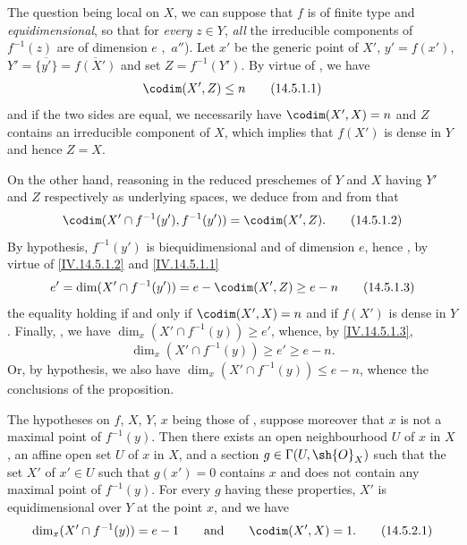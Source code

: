 The question being local on $X$, we can suppose that $f$ is of finite type and \emph{equidimensional}, so that for \emph{every} $z\in Y$, \emph{all} the irreducible components of $f^{-1}(z)$ are of dimension $e$ ,~$a''$).
Let $x'$ be the generic point of $X'$, $y'=f(x')$, $Y'=\overline{\{y'\}}=\overline{f(X')}$ and set $Z=f^{-1}(Y')$.
By virtue of , we have
\begin{equation}
  \codim(X',Z)\leq n
  \tag{14.5.1.1}\label{IV.14.5.1.1}
\end{equation}
and if the two sides are equal, we necessarily have $\codim(X',X)=n$ and $Z$ contains an irreducible component of $X$, which implies  that $f(X')$ is dense in $Y$ and hence $Z=X$.

On the other hand, reasoning in the reduced preschemes of $Y$ and $X$ having $Y'$ and $Z$ respectively as underlying spaces, we deduce from  and from  that
\begin{equation}
  \codim(X'\cap f^{-1}(y'),f^{-1}(y'))=\codim(X',Z).
  \tag{14.5.1.2}\label{IV.14.5.1.2}
\end{equation}
By hypothesis, $f^{-1}(y')$ is biequidimensional  and of dimension $e$, hence , by virtue of \eqref{IV.14.5.1.2} and \eqref{IV.14.5.1.1}
\begin{equation}
  e'=\dim(X'\cap f^{-1}(y'))=e-\codim(X',Z)\geq e-n
  \tag{14.5.1.3}\label{IV.14.5.1.3}
\end{equation}
the equality holding if and only if $\codim(X',X)=n$ and if $f(X')$ is dense in $Y$.
Finally, , we have $\dim_x(X'\cap f^{-1}(y))\geq e'$, whence, by \eqref{IV.14.5.1.3},
\begin{equation}
  \dim_x(X'\cap f^{-1}(y))\geq e'\geq e-n.
  \tag{14.5.1.4}\label{IV.14.5.1.4}
\end{equation}
Or, by hypothesis, we also have $\dim_x(X'\cap f^{-1}(y))\leq e-n$, whence the conclusions of the proposition.

\begin{corollary}[14.5.2]
\label{IV.14.5.2}
The hypotheses on $f$, $X$, $Y$, $x$ being those of , suppose moreover that $x$ is not a maximal point of $f^{-1}(y)$.
Then there exists an open neighbourhood $U$ of $x$ in $X$, an affine open set $U$ of $x$ in $X$, and a section $g\in\Gamma(U,\sh{O}_X)$ such that the set $X'$ of $x'\in U$ such that $g(x')=0$ contains $x$ and does not contain any maximal point of $f^{-1}(y)$.
For every $g$ having these properties, $X'$ is equidimensional over $Y$ at the point $x$, and we have
\begin{equation}
  \dim_x(X'\cap f^{-1}(y))=e-1 \qquad\text{and}\qquad \codim(X',X)=1.
  \tag{14.5.2.1}\label{IV.14.5.2.1}
\end{equation}
\end{corollary}

